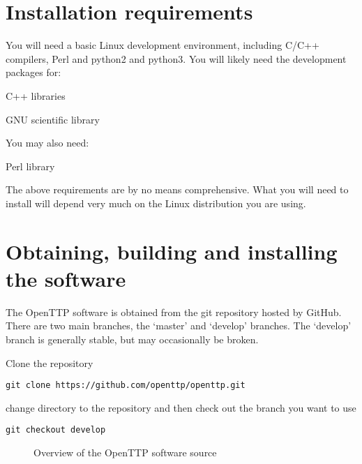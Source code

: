 
\section{Installation requirements}

You will need a basic Linux development environment, including C/C++ compilers, Perl and python2 and python3.
You will likely need the development packages for:
\begin{description*}
	\item[\cc{boost}]  C++ libraries
	\item[\cc{libgsl}] GNU scientific library
\end{description*}

You may also need:
\begin{description*}
	\item[\cc{Time::HiRes}] Perl library
\end{description*}

The above requirements are by no means comprehensive.
What you will need to install will depend very much on the
Linux distribution you are using.

\section{Obtaining, building and installing the software}

The OpenTTP software is obtained from the git repository hosted by GitHub.
There are two main branches, the `master' and `develop' branches.
The `develop' branch is generally stable, but may occasionally be broken.

Clone the repository
\begin{lstlisting}
git clone https://github.com/openttp/openttp.git
\end{lstlisting}
change directory to the repository and then check out the branch you want to use
\begin{lstlisting}
git checkout develop
\end{lstlisting}

\begin{figure}
\caption{Overview of the OpenTTP software source}
\end{figure}

